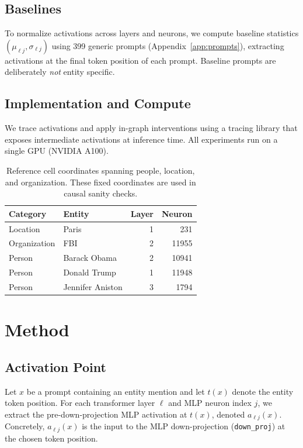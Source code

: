 \documentclass[10pt,twocolumn]{article}
\begin{document}
\subsection{Baselines}
To normalize activations across layers and neurons, we compute baseline statistics $(\mu_{\ell j}, \sigma_{\ell j})$ using 399 generic prompts (Appendix~\ref{app:prompts}), extracting activations at the final token position of each prompt. Baseline prompts are deliberately \emph{not} entity specific.

\subsection{Implementation and Compute}
We trace activations and apply in-graph interventions using a tracing library that exposes intermediate activations at inference time. All experiments run on a single GPU (NVIDIA A100).

\begin{table}[!h]
\centering
\scriptsize
\begingroup
\setlength{\tabcolsep}{2pt}
\renewcommand{\arraystretch}{1.08}
\begin{tabular}{@{}
  >{\raggedright\arraybackslash}p{}
  >{\raggedright\arraybackslash}p{}
  rr
@{}}
\toprule
\textbf{Category} & \textbf{Entity} & \textbf{Layer} & \textbf{Neuron} \\
\midrule
Location & Paris & 1 & 231 \\
Organization & FBI & 2 & 11955 \\
Person & Barack Obama & 2 & 10941 \\
Person & Donald Trump & 1 & 11948 \\
Person & Jennifer Aniston & 3 & 1794 \\
\bottomrule
\end{tabular}
\endgroup
\caption{Reference cell coordinates spanning people, location, and organization. These fixed coordinates are used in causal sanity checks.}
\label{tab:validation_set}
\end{table}

\section{Method}
\subsection{Activation Point}
Let $x$ be a prompt containing an entity mention and let $t(x)$ denote the entity token position. For each transformer layer $\ell$ and MLP neuron index $j$, we extract the pre-down-projection MLP activation at $t(x)$, denoted $a_{\ell j}(x)$. Concretely, $a_{\ell j}(x)$ is the input to the MLP down-projection (\texttt{down\_proj}) at the chosen token position.
\end{document}
